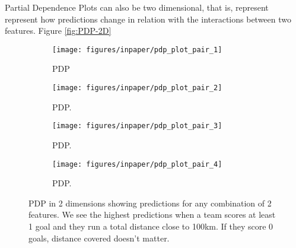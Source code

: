 \documentclass[preprint,12pt]{elsarticle}
\begin{document}
Partial Dependence Plots can also be two dimensional, that is, represent represent how predictions change in relation with the interactions between two features. Figure \ref{fig:PDP-2D}  
\begin{figure}[]
    \centering
    \begin{subfigure}[t]{0.48\textwidth}
        \centering
        \texttt{[image: figures/inpaper/pdp\_plot\_pair\_1]}
        \caption{PDP }
    \end{subfigure}
    \hfill
    \begin{subfigure}[t]{0.48\textwidth}
        \centering
        \texttt{[image: figures/inpaper/pdp\_plot\_pair\_2]}
        \caption{PDP.}
    \end{subfigure}%

    \begin{subfigure}[t]{0.48\textwidth}
        \centering
        \texttt{[image: figures/inpaper/pdp\_plot\_pair\_3]}
        \caption{PDP.}
    \end{subfigure}
    \hfill
    \begin{subfigure}[t]{0.48\textwidth}
        \centering
        \texttt{[image: figures/inpaper/pdp\_plot\_pair\_4]}
        \caption{PDP.}
    \end{subfigure}%
    \caption{PDP in 2 dimensions showing predictions for any combination of 2 features. We see the highest predictions when a team scores at least 1 goal and they run a total distance close to 100km. If they score 0 goals, distance covered doesn't matter.
}
\end{figure}
\end{document}
